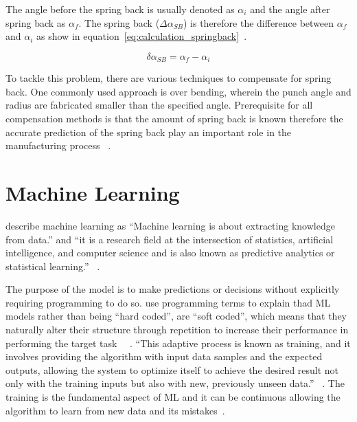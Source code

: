 The angle before the spring back is usually denoted as $\alpha_i$ and the angle after spring back as $\alpha_f$.
The spring back ($\Delta \alpha_{SB}$) is therefore the difference between $\alpha_f$ and
$\alpha_i$ as show in equation~\ref*{eq:calculation_springback}~\cite[p. 6]{cruz2021application}.


\begin{tcolorbox}[arc=0pt,boxrule=0.5pt]
    \begin{equation}
        \delta \alpha_{SB} = \alpha_f - \alpha_i
        \label{eq:calculation_springback}
    \end{equation}
\end{tcolorbox}

To tackle this problem, there are various techniques to compensate for spring back.
One commonly used approach is over bending, wherein the punch angle and radius are fabricated smaller than the
specified angle.
Prerequisite for all compensation methods is that the amount of spring back is known therefore
the accurate prediction of the spring back play an important role in the manufacturing
process ~\cite[p. 114]{groover2020fundamentals}.


\section{Machine Learning}\label{sec:machine-learning}
\cite{muller2016introduction} describe machine learning as ``Machine learning is about extracting
knowledge from data.'' and ``it is a research field at the intersection of statistics, artificial intelligence, and
computer science and is also known as predictive analytics or statistical learning.''
~\cite[p. 1]{muller2016introduction}.

The purpose of the model is to make predictions or decisions without explicitly requiring programming to do so.
\cite{el2015machine} use programming terms to explain thad ML models rather than being ``hard coded'', are ``soft
coded'', which means that they naturally alter their structure through repetition to increase their performance in
performing the target task ~\cite[pp. 4]{el2015machine}~\cite[pp. 151--170]{koza1996automated}.
``This adaptive process is known as training, and it involves providing the algorithm with input data samples and the
expected outputs, allowing the system to optimize itself to achieve the desired result not only with the training
inputs but also with new, previously unseen data.''
~\cite[pp. 4]{el2015machine}.
The training is the fundamental aspect of \ac{ML} and it can be continuous allowing the algorithm to
learn from new data and its mistakes~\cite[pp. 4]{el2015machine}.

